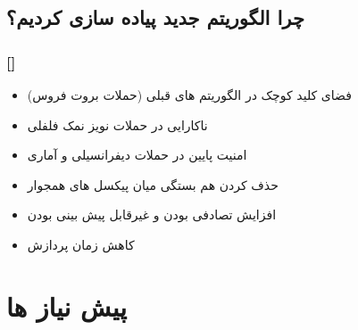 \documentclass[xcolor=dvipsnames, professionalfonts, 11pt]{beamer}
\newcommand*{\makeframetitle}{\frametitle{\insertsection \hspace{0.1em} {\footnotesize [\insertsubsection]}}}
\begin{document}
\subsection{چرا الگوریتم جدید پیاده سازی کردیم؟}
\begin{frame}
    \makeframetitle
    \begin{itemize}
      \item فضای کلید کوچک در الگوریتم های قبلی (حملات بروت فروس)
      \item ناکارایی در حملات نویز نمک فلفلی
      \item امنیت پایین در حملات دیفرانسیلی و آماری
      \item حذف کردن هم بستگی میان پیکسل های همجوار
      \item افزایش تصادفی بودن و غیرقابل پیش بینی بودن
      \item کاهش زمان پردازش
    \end{itemize}
\end{frame}

\section{پیش نیاز ها}
\end{document}
